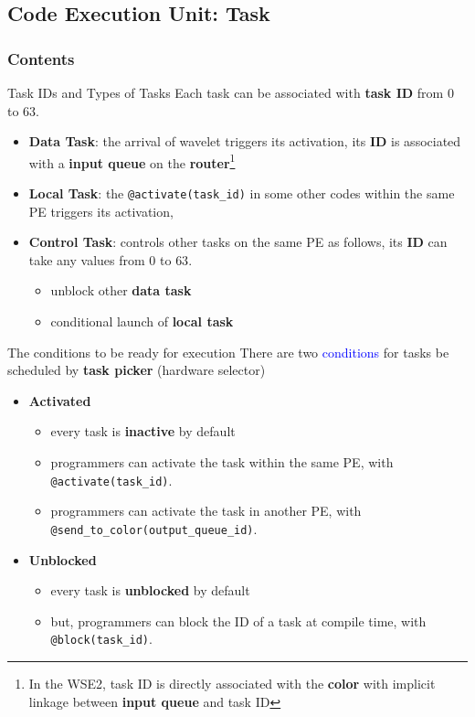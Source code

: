 \documentclass[dvipdfmx, 11pt, aspectratio=169]{beamer}   %
\begin{document}
\subsection{Code Execution Unit: Task}
\begin{frame}
    \frametitle{Contents}
\end{frame}
\begin{frame}{Task IDs and Types of Tasks}
Each task can be associated with \textbf{task ID} from $0$ to $63$.
\begin{itemize}
    \item \textbf{Data Task}: the arrival of wavelet triggers its activation, its \textbf{ID} is associated with a \textbf{input queue} on the \textbf{router}\footnote{In the WSE2, task ID is directly associated with the \textbf{color} with implicit linkage between \textbf{input queue} and task ID}
    \item \textbf{Local Task}: the \lstinline|@activate(task_id)| in some other codes within the same PE triggers its activation, 
    \item \textbf{Control Task}: controls other tasks on the same PE as follows, its \textbf{ID} can take any values from $0$ to $63$.
    \begin{itemize}
        \item unblock other \textbf{data task}
        \item conditional launch of \textbf{local task}
    \end{itemize}
\end{itemize}
\end{frame}
\begin{frame}[fragile]{The conditions to be ready for execution}
There are two \textcolor{blue}{conditions} for tasks be scheduled by \textbf{task picker} (hardware selector)
\begin{itemize}
    \item \textbf{Activated}
    \begin{itemize}
        \item every task is \textbf{inactive} by default
        \item programmers can activate the task within the same PE, with \lstinline|@activate(task_id)|.
        \item programmers can activate the task in another PE, with \lstinline|@send_to_color(output_queue_id)|.
    \end{itemize}
    \item \textbf{Unblocked} 
    \begin{itemize}
        \item every task is \textbf{unblocked} by default
        \item but, programmers can block the ID of a task at compile time, with \lstinline|@block(task_id)|.
    \end{itemize}
\end{itemize}
\end{frame}
\end{document}
